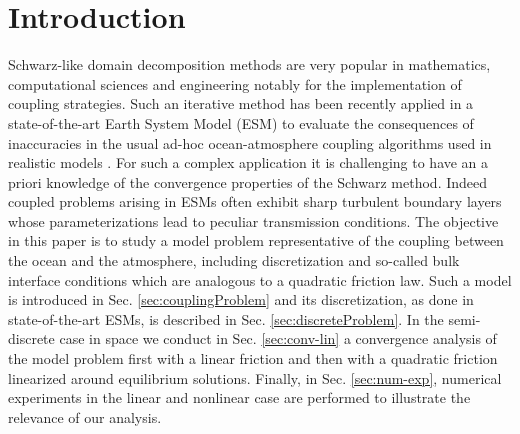 

\section{Introduction}
Schwarz-like domain decomposition methods are very popular in 
mathematics, computational sciences and engineering notably for 
the implementation of coupling strategies. Such an iterative method
has been recently applied in a state-of-the-art Earth 
System Model (ESM) to evaluate the consequences of inaccuracies 
in the usual ad-hoc ocean-atmosphere coupling algorithms 
used in realistic models \cite{marti_schwarz_2021}. For such 
a complex application it is challenging to have an a priori 
knowledge of the convergence properties of the Schwarz method. 
Indeed coupled problems arising in ESMs often 
exhibit sharp turbulent boundary layers whose parameterizations 
lead to peculiar transmission conditions. The objective in
this paper is to study a model problem representative 
of the coupling between the ocean and the atmosphere, including discretization 
and so-called bulk interface conditions which are analogous to a 
quadratic friction law. Such a model is introduced in Sec. \ref{sec:couplingProblem}
and its discretization, as done in state-of-the-art ESMs, 
is described in Sec. \ref{sec:discreteProblem}. In the semi-discrete
case in space we conduct in Sec. \ref{sec:conv-lin} a convergence analysis 
of the model problem first with a linear friction and then with a 
quadratic friction linearized around equilibrium solutions. 
Finally, in Sec. \ref{sec:num-exp}, numerical experiments in the 
linear and nonlinear case are performed to illustrate the relevance 
of our analysis. \par
%
